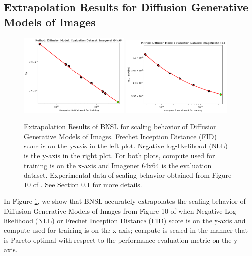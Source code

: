 \documentclass{article} %
\begin{document}
\FloatBarrier

\clearpage


\subsection{Extrapolation Results for Diffusion Generative Models of Images}
\label{section:diffusion}

\begin{figure}[htbp]
    \centering
\includegraphics[width=0.48\textwidth]{figures/diffusion/diffusion__fid.png}
\includegraphics[width=0.48\textwidth]{figures/diffusion/diffusion__nll.png}

    \caption{
Extrapolation Results of BNSL for scaling behavior of Diffusion Generative Models of Images. Frechet Inception Distance (FID) score is on the y-axis in the left plot. Negative log-likelihood (NLL) is the y-axis in the right plot. For both plots, compute used for training is on the x-axis and Imagenet 64x64 is the evaluation dataset. Experimental data of scaling behavior obtained from Figure 10 of \cite{nichol2021improved}. See Section \ref{section:diffusion} for more details.
    }
    \label{fig:diffusion_compute_scaling}
\end{figure}

In Figure \ref{fig:diffusion_compute_scaling}, we show that BNSL accurately extrapolates the scaling behavior of Diffusion Generative Models of Images from Figure 10 of \cite{nichol2021improved} when Negative Log-likelihood (NLL) or Frechet Inception Distance (FID) score is on the y-axis and compute used for training is on the x-axis; compute is scaled in the manner that is Pareto optimal with respect to the performance evaluation metric on the y-axis.
\end{document}
